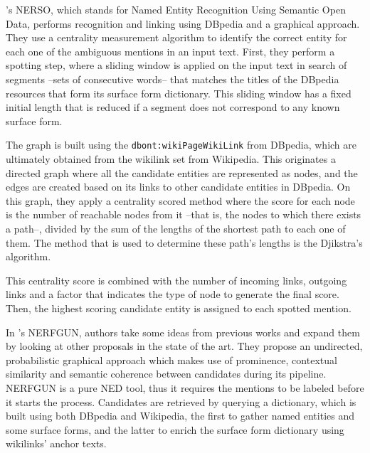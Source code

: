\medskip

\cite{hakimov2012}'s NERSO, which stands for Named Entity Recognition Using Semantic Open Data, performs recognition and linking using DBpedia and a graphical approach. They use a centrality measurement algorithm to identify the correct entity for each one of the ambiguous mentions in an input text. First, they perform a spotting step, where a sliding window is applied on the input text in search of segments --sets of consecutive words-- that matches the titles of the DBpedia resources that form its surface form dictionary. This sliding window has a fixed initial length that is reduced if a segment does not correspond to any known surface form.

The graph is built using the {\smaller \texttt{dbont:wikiPageWikiLink}} from DBpedia, which are ultimately obtained from the wikilink set from Wikipedia. This originates a directed graph where all the candidate entities are represented as nodes, and the edges are created based on its links to other candidate entities in DBpedia. On this graph, they apply a centrality scored method where the score for each node is the number of reachable nodes from it --that is, the nodes to which there exists a path--, divided by the sum of the lengths of the shortest path to each one of them. The method that is used to determine these path's lengths is the Djikstra's algorithm.

This centrality score is combined with the number of incoming links, outgoing links and a factor that indicates the type of node to generate the final score. Then, the highest scoring candidate entity is assigned to each spotted mention.

\medskip

In \cite{hakimov2016}'s NERFGUN, authors take some ideas from previous works and expand them by looking at other proposals in the state of the art. They propose an undirected, probabilistic graphical approach which makes use of prominence, contextual similarity and semantic coherence between candidates during its pipeline. NERFGUN is a pure NED tool, thus it requires the mentions to be labeled before it starts the process. Candidates are retrieved by querying a dictionary, which is built using both DBpedia and Wikipedia, the first to gather named entities and some surface forms, and the latter to enrich the surface form dictionary using wikilinks' anchor texts.

